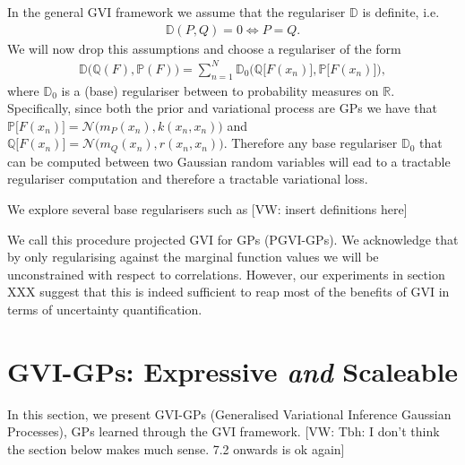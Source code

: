 \documentclass{article}
\newcommand{\vw}[1]{{\color{green} [VW: #1]}}
\newcommand{\bbP}{\mathbb{P}}
\newcommand{\bbR}{\mathbb{R}}
\newcommand{\bbD}{\mathbb{D}}
\newcommand{\bbQ}{\mathbb{Q}}
\numberwithin{equation}{section}
\begin{document}
In the general GVI framework we assume that the regulariser $\bbD$ is definite, i.e.
\begin{align}
    \bbD(P,Q) = 0 \iff P =Q.
\end{align}
We will now drop this assumptions and choose a regulariser of the form
\begin{align}
    \bbD\big(  \bbQ(F), \bbP(F) \big) = \sum_{n=1}^N \bbD_0\Big(  \bbQ\big[F(x_n)\big], \bbP\big[F(x_n)\big] \Big),
\end{align}
where $\bbD_0$ is a (base) regulariser between to probability measures on $\bbR$. Specifically, since both the prior and variational process are GPs we have that $\bbP\big[F(x_n)\big] = \mathcal{N}\big(m_P(x_n), k(x_n,x_n)\big)$ and $\bbQ\big[F(x_n)\big] = \mathcal{N}\big(m_Q(x_n), r(x_n,x_n)\big)$. Therefore any base regulariser $\bbD_0$ that can be computed between two Gaussian random variables will ead to a tractable regulariser computation and therefore a tractable variational loss.

We explore several base regularisers such as \vw{insert definitions here}

We call this procedure projected GVI for GPs (PGVI-GPs). We acknowledge that by only regularising against the marginal function values we will be unconstrained with respect to correlations. However, our experiments in section XXX suggest that this is indeed sufficient to reap most of the benefits of GVI in terms of uncertainty quantification.






\section{GVI-GPs: Expressive \textit{and} Scaleable}





In this section, we present GVI-GPs (Generalised Variational Inference Gaussian Processes), GPs learned through the GVI framework.
\vw{Tbh: I don't think the section below makes much sense. 7.2 onwards is ok again}
\end{document}
